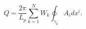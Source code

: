 \begin{equation}
Q=\frac{2\pi }{L_p}\sum_{k=1}^NW_k\oint_{\gamma _k}A_idx^i.  \label{CSact3}
\end{equation}

